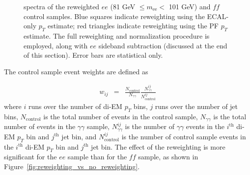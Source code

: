 \documentclass[dissertation_bw.tex]{subfiles}
\begin{document}
\begin{figure}
	\hspace{1cm}
	\caption{\MET spectra of the reweighted $ee$ (81 GeV $\leq m_{\mathrm{ee}} <$ 101 GeV) and $\mathit{ff}$ control samples.  Blue squares indicate reweighting using the ECAL-only $p_{T}$ estimate; red triangles indicate reweighting using the PF $p_{T}$ estimate.  The full reweighting and normalization procedure is employed, along with $ee$ sideband subtraction (discussed at the end of this section).  Error bars are statistical only.}
	\label{fig:ee_vs_ff_di-EM_vs_dijet_pT_reweighting}
\end{figure}

The control sample event weights are defined as

\begin{eqnarray}
w_{ij} &=& \frac{N_{\mathrm{control}}}{N_{\gamma\gamma}}\frac{N_{\gamma\gamma}^{ij}}{N_{\mathrm{control}}^{ij}}
\end{eqnarray}
%
where $i$ runs over the number of di-EM $p_{T}$ bins, $j$ runs over the number of jet bins, $N_{\mathrm{control}}$ is the total number of events in the control sample, $N_{\gamma\gamma}$ is the total number of events in the $\gamma\gamma$ sample, $N_{\gamma\gamma}^{ij}$ is the number of $\gamma\gamma$ events in the $i^{\mathrm{th}}$ di-EM $p_{T}$ bin and $j^{\mathrm{th}}$ jet bin, and $N_{\mathrm{control}}^{ij}$ is the number of control sample events in the $i^{\mathrm{th}}$ di-EM $p_{T}$ bin and $j^{\mathrm{th}}$ jet bin.  The effect of the reweighting is more significant for the $ee$ sample than for the $\mathit{ff}$ sample, as shown in Figure~\ref{fig:reweighting_vs_no_reweighting}.
\end{document}
